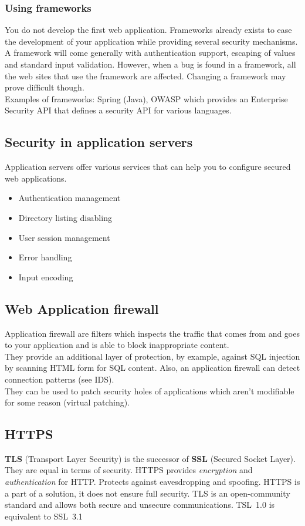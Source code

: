 \subsubsection{Using frameworks}
You do not develop the first web application. Frameworks already exists to
ease the development of your application while providing several security
mechanisms.
A framework will come generally with authentication support, escaping of
values and standard input validation.
However, when a bug is found in a framework, all the web sites that use the
framework are affected. Changing a framework may prove difficult though.\\

Examples of frameworks: Spring (Java), OWASP which provides an Enterprise
Security API that defines a security API for various languages.

\subsection{Security in application servers}
Application servers offer various services that can help you to configure
secured web applications.

\begin{itemize}
\item Authentication management
\item Directory listing disabling
\item User session management
\item Error handling
\item Input encoding
\end{itemize}

\subsection{Web Application firewall}
Application firewall are filters which inspects the traffic that comes
from and goes to your application and is able to block inappropriate
content.\\
They provide an additional layer of protection, by example, against
SQL injection by scanning HTML form for SQL content.
Also, an application firewall can detect connection patterns (see IDS).
\\
They can be used to patch security holes of applications which aren't
modifiable for some reason (virtual patching).

\subsection{HTTPS}
\textbf{TLS} (Transport Layer Security) is the successor of \textbf{SSL}
(Secured Socket Layer).
They are equal in terms of security.
HTTPS provides \emph{encryption} and \emph{authentication} for HTTP.
\newline Protects against eavesdropping and spoofing.
HTTPS is a part of a solution, it does not ensure full security.
TLS is an open-community standard and allows both secure and unsecure
communications.
\newline TSL~1.0 is equivalent to SSL~3.1

